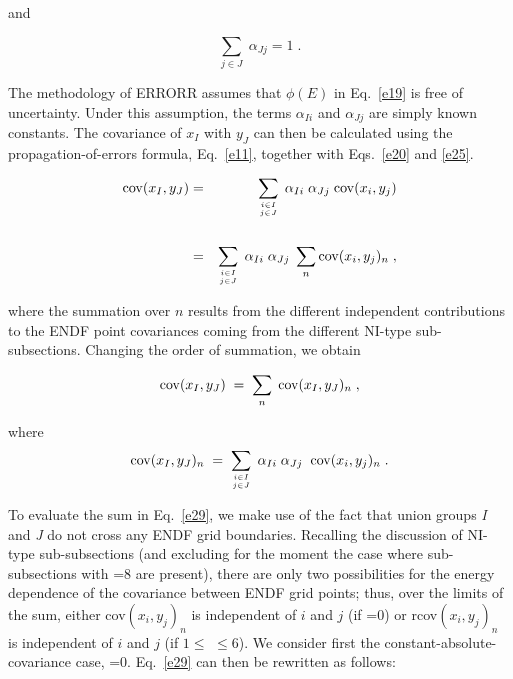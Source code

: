 \noindent
and

\begin{equation}
\sum_{j \in J} \; \alpha_{Jj} = 1 \;.
\label{e26}
\end{equation}

The methodology of ERRORR assumes that $\phi(E)$ in Eq.~\ref{e19} is
free of uncertainty.  Under this assumption, the terms $\alpha_{Ii}$
and $\alpha_{Jj}$ are simply known constants.  The covariance of $x_I$
with $y_J$ can then be calculated using the propagation-of-errors
formula, Eq.~\ref{e11}, together with Eqs.~\ref{e20} and \ref{e25}.

\begin{eqnarray}
{\rm {\rm cov}} (x_I,y_J) & = & \sum_{i\in I\atop{j\in J}}\;
  \alpha_{Ii} \; \alpha_{Jj} \; {\rm cov}
 (x_i ,y_j) \nonumber \\
\nonumber \\
 & = & \sum_{i\in I\atop{j\in J}}\; \alpha_{Ii} \; \alpha_{Jj} \; \sum_{n}{\rm
 cov} (x_i ,y_j)_n \; ,
\end{eqnarray}

\noindent
where the summation over $n$ results from the different independent
contributions to the ENDF point covariances coming from the different
NI-type sub-subsections.  Changing the order of summation, we obtain

\begin{equation}
{\rm  cov} (x_I,y_J) \; = \; \sum_{n} \; {\rm cov} (x_I,y_J)_n \; ,
\label{e28}
\end{equation}

\noindent
where
\begin{equation}
{\rm cov} (x_I,y_J)_n \;=\; \sum_{i\in I\atop{j\in J}} \; \alpha_{Ii}\;
\alpha_{Jj}\;\; {\rm {\rm cov}} (x_i,y_j)_n \; .
\label{e29}
\end{equation}

To evaluate the sum in Eq.~\ref{e29}, we make use of the fact that union
groups {\it I} and {\it J} do not cross any ENDF grid boundaries.
Recalling the discussion of NI-type sub-subsections (and
excluding for the moment the case where sub-subsections with
=8 are present), there are only two possibilities for the
energy dependence of the covariance between ENDF grid points; thus,
over the limits of the sum, either cov$(x_i,y_j)_n$ is independent of
$i$ and $j$ (if =0) or rcov$(x_i,y_j)_n$ is independent of
$i$ and $j$ (if $1\leq$  $\leq 6$).  We consider first the
constant-absolute-covariance case, =0.  Eq.~\ref{e29} can then be
rewritten as follows:

